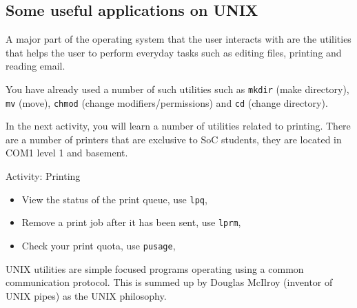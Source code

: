 \subsection{Some useful applications on UNIX}
A major part of the operating system that the user interacts with are the
utilities that helps the user to perform everyday tasks such as editing files,
printing and reading email.     

You have already used a number of such utilities such as \texttt{mkdir} (make
directory), \texttt{mv} (move), \texttt{chmod} (change modifiers/permissions)
and \texttt{cd} (change directory).

In the next activity, you will learn a number of utilities related to printing.
There are a number of printers that are exclusive to SoC students, they are
located in COM1 level 1 and basement.  

\begin{frame}{Activity: Printing}

\begin{itemize}
\item View the status of the print queue, use \texttt{lpq}, 
\item Remove a print job after it has been sent, use \texttt{lprm}, 
\item Check your print quota, use \texttt{pusage}, 
\end{itemize}

\end{frame}

UNIX utilities are simple focused programs operating using a common
communication protocol. This is summed up by Douglas McIlroy (inventor of UNIX
pipes) as the UNIX philosophy.   

